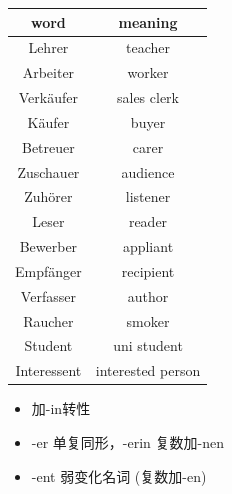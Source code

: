 \begin{center}
    \begin{tabular}{|c|c|}
        \hline
        \rowcolor{gray}
        word        & meaning           \\
        \hline
        Lehrer      & teacher           \\
        Arbeiter    & worker            \\
        Verkäufer   & sales clerk       \\
        \hline
        Käufer      & buyer             \\
        Betreuer    & carer             \\
        Zuschauer   & audience          \\
        Zuhörer     & listener          \\
        Leser       & reader            \\
        Bewerber    & appliant          \\
        Empfänger   & recipient         \\
        Verfasser   & author            \\
        Raucher     & smoker            \\
        \hline
        Student     & uni student       \\
        Interessent & interested person \\
        \hline
    \end{tabular}
\end{center}

\begin{itemize}
    \item 加-in转性
    \item -er 单复同形，-erin 复数加-nen
    \item -ent 弱变化名词 (复数加-en)
\end{itemize}